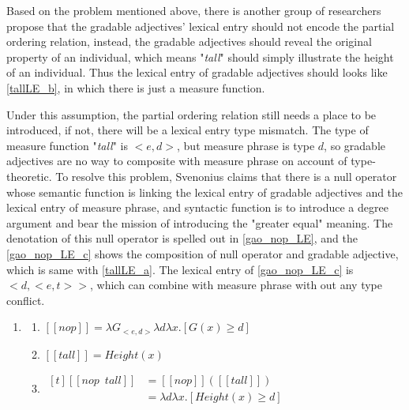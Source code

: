 \documentclass{ctexart}
\let \cite \parencite
\begin{document}
\noindent
Based on the problem mentioned above, there is another group of researchers propose that the gradable adjectives' lexical entry should not encode the partial ordering relation, instead, the gradable adjectives should reveal the original property of an individual, which means "\textit{tall}" should simply illustrate the height of an individual. Thus the lexical entry of gradable adjectives should looks like \ref{tallLE_b}, in which there is just a measure function. 

Under this assumption, the partial ordering relation still needs a place to be introduced, if not, there will be a lexical entry type mismatch. The type of measure function "\textit{tall}" is $<e,d>$, but measure phrase is type $d$, so gradable adjectives are no way to composite with measure phrase on account of type-theoretic. To resolve this problem, Svenonius\cite{svenonius2006} claims that there is a null operator whose semantic function is linking the lexical entry of gradable adjectives and the lexical entry of measure phrase, and syntactic function is to introduce a degree argument and bear the mission of introducing the "greater equal" meaning. The denotation of this null operator is spelled out in \ref{gao_nop_LE}, and the \ref{gao_nop_LE_c} shows the composition of null operator and gradable adjective, which is same with \ref{tallLE_a}. The lexical entry of \ref{gao_nop_LE_c} is $<d,<e,t>>$, which can combine with measure phrase with out any type conflict.

\begin{enumerate}
    \item \label{gao_nop_LE}

    \begin{enumerate}
        \item \label{gao_nop_LE_a} 
        $[\![nop]\!]=\lambda G_{<e,d>}\lambda d \lambda x.[G(x) \geq d]$

        \item \label{gao_nop_LE_b} 
        $[\![tall]\!]=Height(x)$

        \item \label{gao_nop_LE_c} 
        $\begin{aligned}[t]
            [\![nop \enspace tall]\!] &= [\![nop]\!]([\![tall]\!]) \\
            &= \lambda d \lambda x.[Height(x) \geq d]
        \end{aligned}$

    \end{enumerate}
\end{enumerate}
\end{document}
